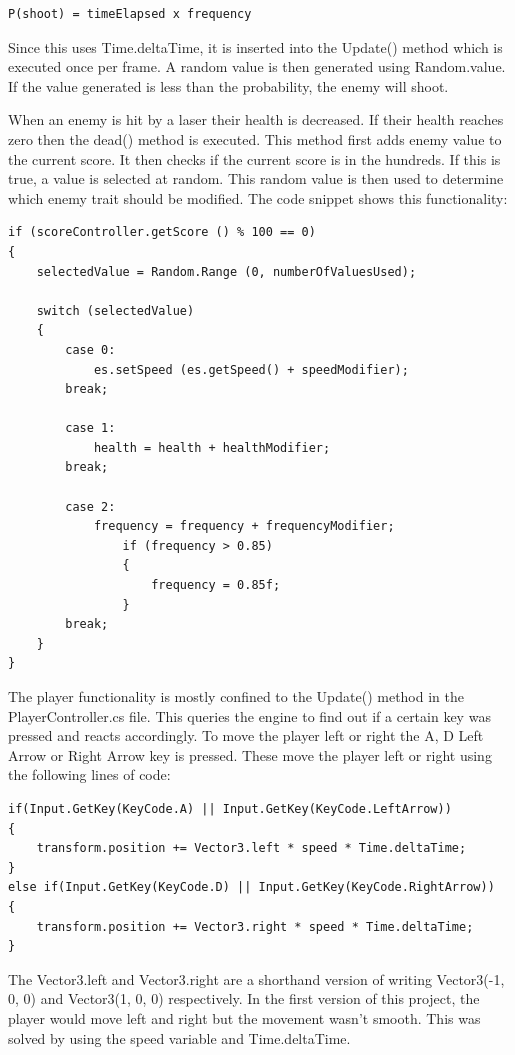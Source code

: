 \documentclass[12pt]{article}
\begin{document}
\begin{verbatim}
P(shoot) = timeElapsed x frequency
\end{verbatim}

Since this uses Time.deltaTime, it is inserted into the Update() method which is executed once per frame. A random value is then generated using Random.value. If the value generated is less than the probability, the enemy will shoot.  

When an enemy is hit by a laser their health is decreased. If their health reaches zero then the dead() method is executed. This method first adds enemy value to the current score. It then checks if the current score is in the hundreds. If this is true, a value is selected at random. This random value is then used to determine which enemy trait should be modified. The code snippet shows this functionality: 

\begin{lstlisting}
if (scoreController.getScore () % 100 == 0) 
{
	selectedValue = Random.Range (0, numberOfValuesUsed); 

	switch (selectedValue) 
	{
		case 0:
			es.setSpeed (es.getSpeed() + speedModifier);
		break;

		case 1:
			health = health + healthModifier;
		break;

		case 2:
			frequency = frequency + frequencyModifier;
				if (frequency > 0.85) 
				{
					frequency = 0.85f;
				}
		break;
	}
}
\end{lstlisting}

The player functionality is mostly confined to the Update() method in the PlayerController.cs file. This queries the engine to find out if a certain key was pressed and reacts accordingly. To move the player left or right the A, D Left Arrow or Right Arrow key is pressed. These move the player left or right using the following lines of code: 

\begin{lstlisting}
if(Input.GetKey(KeyCode.A) || Input.GetKey(KeyCode.LeftArrow))
{
	transform.position += Vector3.left * speed * Time.deltaTime;
}
else if(Input.GetKey(KeyCode.D) || Input.GetKey(KeyCode.RightArrow))
{
	transform.position += Vector3.right * speed * Time.deltaTime;
}
\end{lstlisting}

The Vector3.left and Vector3.right are a shorthand version of writing Vector3(-1, 0, 0) and Vector3(1, 0, 0) respectively. In the first version of this project, the player would move left and right but the movement wasn't smooth. This was solved by using the speed variable and Time.deltaTime. 
\end{document}
